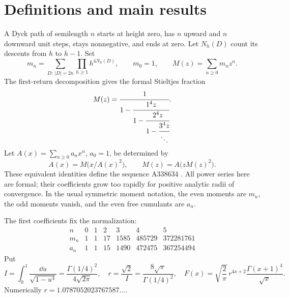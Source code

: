 \documentclass[11pt,letterpaper]{article}
\numberwithin{equation}{section}
\theoremstyle{remark}\newtheorem{remark}[theorem]{Remark}
\begin{document}
\section{Definitions and main results}\label{pwd:qt:sec:main}
A Dyck path of semilength $n$ starts at height zero, has $n$ upward and $n$ downward unit steps, stays nonnegative, and ends at zero. Let $N_h(D)$ count its descents from $h$ to $h-1$. Set
\begin{equation}\label{pwd:qt:eq:moments}
 m_n=\sum_{D:\,|D|=2n}\prod_{h\ge1}h^{4N_h(D)},\qquad m_0=1,
 \qquad M(z)=\sum_{n\ge0}m_nz^n.
\end{equation}
The first-return decomposition gives the formal Stieltjes fraction
\begin{equation}\label{pwd:qt:eq:sfraction}
 M(z)=\cfrac{1}{1-\cfrac{1^4z}{1-\cfrac{2^4z}{1-\cfrac{3^4z}{\ddots}}}}.
\end{equation}
Let $A(x)=\sum_{n\ge0}a_nx^n$, $a_0=1$, be determined by
\begin{equation}\label{pwd:qt:eq:transform}
 A(x)=M\bigl(x/A(x)^2\bigr),\qquad M(z)=A\bigl(zM(z)^2\bigr).
\end{equation}
These equivalent identities define the sequence A338634 \cite{oeisA338634}. All power series here are formal; their coefficients grow too rapidly for positive analytic radii of convergence. In the usual symmetric moment notation, the even moments are $m_n$, the odd moments vanish, and the even free cumulants are $a_n$.

The first coefficients fix the normalization:
\[
\begin{array}{c|rrrrrr}
 n&0&1&2&3&4&5\\ \hline
 m_n&1&1&17&1585&485729&372281761\\
 a_n&1&1&15&1490&472475&367254494
\end{array}
\]
Put
\begin{equation}\label{pwd:qt:eq:constants}
 I=\int_0^1\frac{\dd u}{\sqrt{1-u^4}}
   =\frac{\Gamma(1/4)^2}{4\sqrt{2\pi}},\quad
 r=\frac{\sqrt2}{I}=\frac{8\sqrt\pi}{\Gamma(1/4)^2},\quad
 F(x)=\sqrt{\frac2\pi}\,r^{4x+2}\frac{\Gamma(x+1)^4}{\sqrt x}.
\end{equation}
Numerically $r=1.0787052023767587\ldots$.
\end{document}
